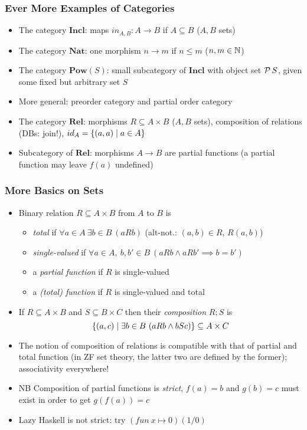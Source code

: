 \documentclass[handout]{beamer}
\newcommand{\bfsf}[1]{{\boldsymbol{#1}}}
\newcommand{\Nat}{\bfsf{Nat}}
\newcommand{\Incl}{\bfsf{Incl}}
\newcommand{\Rel}{\bfsf{Rel}}
\begin{document}
\frame
  {   
    \frametitle{Ever More Examples of Categories}\label{Ch2:everMoreExaCat}
 \begin{itemize}[<+->]
\item The category $\Incl$: maps $in_{A,B} :A\to B$ if $A\subseteq B$ ($A,B$ sets)
\item The category $\Nat$: one morphism $n\to m$ if $n\leq m$  ($n,m\in\mathbb{N}$)
\item The category $\bfsf{Pow}(S)$: small subcategory of $\Incl$ with object
set $\operatorname{\mathcal{P}}{S}$, given some fixed but arbitrary set $S$
\item More general: preorder category and partial order category
\item The category $\Rel$: morphisms $R\subseteq A\times B$ ($A,B$ sets),
composition of relations (DBs: join!), $id_A = \{(a,a)\mid a\in A\}$
\item Subcategory of $\Rel$: morphisms $A\to B$ are partial functions
(a partial function may leave $f(a)$ undefined)
 \end{itemize}

 }


\frame
  {   
    \frametitle{More Basics on Sets}\label{Ch2:SetBasics}


 \begin{itemize}[<+->]
    \item Binary relation $R\subseteq A\times B$ from $A$ to $B$ is
    \begin{itemize}[<+->]
    \item \emph{total} if  $\forall a\in A~\exists b\in B~(aRb)$ (alt-not.: $(a,b)\in R$, $R(a,b)$)
    \item \emph{single-valued} if  $\forall a\in A,~b,b'\in B~(aRb \wedge aRb' \implies b=b')$
    \item a \emph{partial function} if  $R$ is single-valued
    \item a \emph{(total) function} if  $R$ is single-valued and total
    \end{itemize}
   \item If $R\subseteq A\times B$ and $S\subseteq B\times C$ then their \emph{composition}          
     $R;S$ is \[\{(a,c) \mid \exists b\in B~(aRb\wedge bSc)\}\subseteq A\times C\]
    \item The notion of composition of relations is compatible with that of partial and
     total function (in ZF set theory, the latter two are defined by the former);
     associativity everywhere!
    \item NB Composition of partial functions is \emph{strict}, $f(a)=b$ and $g(b)=c$ must exist
          in order to get $g(f(a))=c$
    \item Lazy Haskell is not strict: try $(fun~x\mapsto 0)(1/0)$
 \end{itemize}

}
\end{document}
